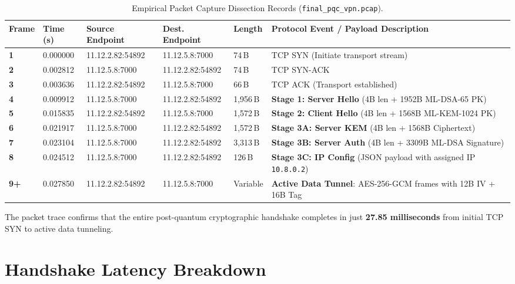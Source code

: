 \begin{table}[htbp]
  \centering
  \footnotesize
  \caption{Empirical Packet Capture Dissection Records (\texttt{final\_pqc\_vpn.pcap}).}
  \label{tab:pcap_dissection_records}
  \begin{tabular}{@{}P{1.2cm}P{1.6cm}P{2.6cm}P{2.6cm}P{1.6cm}P{4.2cm}@{}}
    \toprule
    \textbf{Frame} & \textbf{Time (s)} & \textbf{Source Endpoint} & \textbf{Dest. Endpoint} & \textbf{Length} & \textbf{Protocol Event / Payload Description} \\
    \midrule
    \textbf{1} & 0.000000 & 11.12.2.82:54892 & 11.12.5.8:7000 & 74\,B & TCP SYN (Initiate transport stream) \\
    \textbf{2} & 0.002812 & 11.12.5.8:7000 & 11.12.2.82:54892 & 74\,B & TCP SYN-ACK \\
    \textbf{3} & 0.003636 & 11.12.2.82:54892 & 11.12.5.8:7000 & 66\,B & TCP ACK (Transport established) \\
    \addlinespace
    \textbf{4} & 0.009912 & 11.12.5.8:7000 & 11.12.2.82:54892 & 1,956\,B & \textbf{Stage 1: Server Hello} (4B len + 1952B ML-DSA-65 PK) \\
    \addlinespace
    \textbf{5} & 0.015835 & 11.12.2.82:54892 & 11.12.5.8:7000 & 1,572\,B & \textbf{Stage 2: Client Hello} (4B len + 1568B ML-KEM-1024 PK) \\
    \addlinespace
    \textbf{6} & 0.021917 & 11.12.5.8:7000 & 11.12.2.82:54892 & 1,572\,B & \textbf{Stage 3A: Server KEM} (4B len + 1568B Ciphertext) \\
    \textbf{7} & 0.023104 & 11.12.5.8:7000 & 11.12.2.82:54892 & 3,313\,B & \textbf{Stage 3B: Server Auth} (4B len + 3309B ML-DSA Signature) \\
    \textbf{8} & 0.024512 & 11.12.5.8:7000 & 11.12.2.82:54892 & 126\,B & \textbf{Stage 3C: IP Config} (JSON payload with assigned IP \texttt{10.8.0.2}) \\
    \addlinespace
    \textbf{9+} & 0.027850 & 11.12.2.82:54892 & 11.12.5.8:7000 & Variable & \textbf{Active Data Tunnel}: AES-256-GCM frames with 12B IV + 16B Tag \\
    \bottomrule
  \end{tabular}
\end{table}

The packet trace confirms that the entire post-quantum cryptographic handshake completes in just \textbf{27.85 milliseconds} from initial TCP SYN to active data tunneling.

\section{Handshake Latency Breakdown}
\label{sec:handshake_latency_breakdown}

